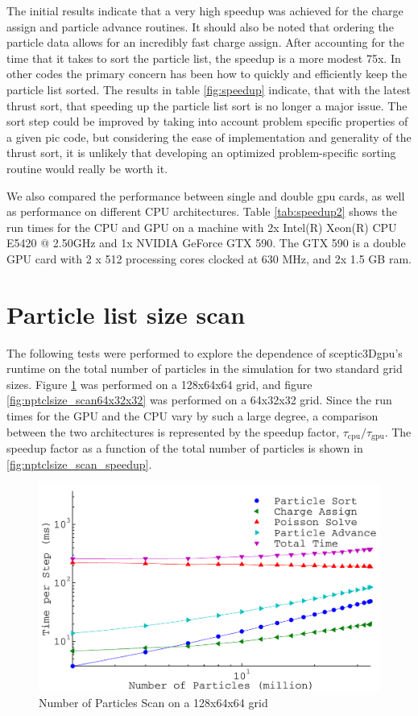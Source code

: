 The initial results indicate that a very high speedup was achieved for the charge assign and particle advance routines. It should also be noted that ordering the particle data allows for an incredibly fast charge assign. After accounting for the time that it takes to sort the particle list, the speedup is a more modest 75x. In other codes the primary concern has been how to quickly and efficiently keep the particle list sorted. The results in table \ref{fig:speedup} indicate, that with the latest thrust sort, that speeding up the particle list sort is no longer a major issue. The sort step could be improved by taking into account problem specific properties of a given pic code, but considering the ease of implementation and generality of the thrust sort, it is unlikely that developing an optimized problem-specific sorting routine would really be worth it. 

We also compared the performance between single and double gpu cards, as well as performance on different CPU architectures. Table \ref{tab:speedup2} shows the run times for the CPU and GPU on a machine with 2x  Intel(R) Xeon(R) CPU E5420 @ 2.50GHz and 1x NVIDIA GeForce GTX 590. The GTX 590 is a double GPU card with 2 x 512 processing cores clocked at 630 MHz, and 2x 1.5 GB ram. 

	
	\section{Particle list size scan}
The following tests were performed to explore the dependence of sceptic3Dgpu's runtime on the total number of particles in the simulation for two standard grid sizes. Figure \ref{fig:nptclsize_scan128x64x64} was performed on a 128x64x64 grid, and figure \ref{fig:nptclsize_scan64x32x32} was performed on a 64x32x32 grid. Since the run times for the GPU and the CPU vary by such a large degree, a comparison between the two architectures is represented by the speedup factor, $\tau_{\mathrm{cpu}}/\tau_{\mathrm{gpu}}$. The speedup factor as a function of the total number of particles is shown in \ref{fig:nptclsize_scan_speedup}.

\begin{figure}
\begin{center}
\includegraphics[width=6in]{performance/nptclsize_scan128x64x64ons8bins.pdf}
\end{center}
\caption{Number of Particles Scan on a 128x64x64 grid}
\label{fig:nptclsize_scan128x64x64}
\end{figure}

